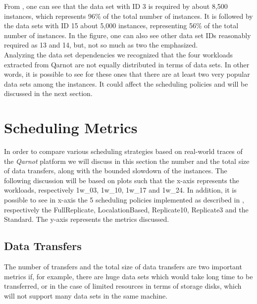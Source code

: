 From , one can see that the data set with ID 3 is required by about 8,500 instances, which represents 96\% of the total number of instances. It is followed by the data sets with ID 15 about 5,000 instances, representing 56\% of the total number of instances. In the figure, one can also see other data set IDs reasonably required as 13 and 14, but, not so much as two the emphasized. \\

Analyzing the data set dependencies we recognized that the four workloads extracted from Qarnot are not equally distributed in terms of data sets. In other words, it is possible to see for these ones that there are at least two very popular data sets among the instances. It could affect the scheduling policies and will be discussed in the next section.

\section{Scheduling Metrics}

In order to compare various scheduling strategies based on real-world traces of the \emph{Qarnot} platform we will discuss in this section the number and the total size of data transfers, along with the bounded slowdown of the instances. The following discussion will be based on plots such that the x-axis represents the workloads, respectively 1w\_03, 1w\_10, 1w\_17 and 1w\_24. In addition, it is possible to see in x-axis the 5 scheduling policies implemented as described in  , respectively the FullReplicate, LocalationBased, Replicate10, Replicate3 and the Standard. The y-axis represents the metrics discussed.

\subsection{Data Transfers}
\label{sub:exp-datasets}

The number of transfers and the total size of data transfers are two important metrics if, for example, there are huge data sets which would take long time to be transferred, or in the case of limited resources in terms of storage disks, which will not support many data sets in the same machine.

